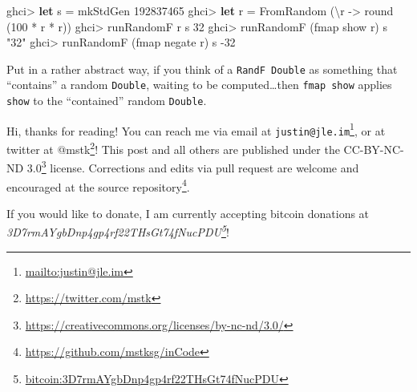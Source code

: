 \documentclass[]{article}
\newenvironment{Shaded}{}{}
\newcommand{\DataTypeTok}[1]{\textcolor[rgb]{0.56,0.13,0.00}{#1}}
\newcommand{\DecValTok}[1]{\textcolor[rgb]{0.25,0.63,0.44}{#1}}
\newcommand{\FunctionTok}[1]{\textcolor[rgb]{0.02,0.16,0.49}{#1}}
\newcommand{\KeywordTok}[1]{\textcolor[rgb]{0.00,0.44,0.13}{\textbf{#1}}}
\newcommand{\NormalTok}[1]{#1}
\newcommand{\OtherTok}[1]{\textcolor[rgb]{0.00,0.44,0.13}{#1}}
\newcommand{\StringTok}[1]{\textcolor[rgb]{0.25,0.44,0.63}{#1}}
\renewcommand{\href}[2]{#2\footnote{\url{#1}}}
\begin{document}
\begin{Shaded}
\begin{Highlighting}[]
\NormalTok{ghci}\FunctionTok{>} \KeywordTok{let}\NormalTok{ s }\FunctionTok{=}\NormalTok{ mkStdGen }\DecValTok{192837465}
\NormalTok{ghci}\FunctionTok{>} \KeywordTok{let}\NormalTok{ r }\FunctionTok{=} \DataTypeTok{FromRandom}\NormalTok{ (\textbackslash{}r }\OtherTok{->}\NormalTok{ round (}\DecValTok{100} \FunctionTok{*}\NormalTok{ r }\FunctionTok{*}\NormalTok{ r))}
\NormalTok{ghci}\FunctionTok{>}\NormalTok{ runRandomF r s}
\DecValTok{32}
\NormalTok{ghci}\FunctionTok{>}\NormalTok{ runRandomF (fmap show r) s}
\StringTok{"32"}
\NormalTok{ghci}\FunctionTok{>}\NormalTok{ runRandomF (fmap negate r) s}
\FunctionTok{-}\DecValTok{32}
\end{Highlighting}
\end{Shaded}

Put in a rather abstract way, if you think of a \texttt{RandF\ Double} as
something that ``contains'' a random \texttt{Double}, waiting to be
computed\ldots{}then \texttt{fmap\ show} applies \texttt{show} to the
``contained'' random \texttt{Double}.

Hi, thanks for reading! You can reach me via email at
\href{mailto:justin@jle.im}{\nolinkurl{justin@jle.im}}, or at twitter at
\href{https://twitter.com/mstk}{@mstk}! This post and all others are published
under the \href{https://creativecommons.org/licenses/by-nc-nd/3.0/}{CC-BY-NC-ND
3.0} license. Corrections and edits via pull request are welcome and encouraged
at \href{https://github.com/mstksg/inCode}{the source repository}.

If you would like to donate, I am currently accepting bitcoin donations at
\emph{\href{bitcoin:3D7rmAYgbDnp4gp4rf22THsGt74fNucPDU}{3D7rmAYgbDnp4gp4rf22THsGt74fNucPDU}}!
\end{document}
